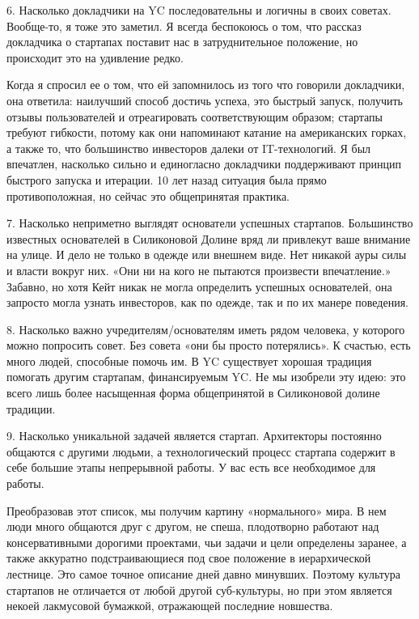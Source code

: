 \documentclass[ebook,12pt,oneside,openany]{memoir}
\begin{document}
6. Насколько докладчики на YC последовательны и логичны в своих
советах. Вообще-то, я тоже это заметил. Я всегда беспокоюсь о том, что
рассказ докладчика о стартапах поставит нас в затруднительное
положение, но происходит это на удивление редко.

Когда я спросил ее о том, что ей запомнилось из того что говорили
докладчики, она ответила: наилучший способ достичь успеха, это быстрый
запуск, получить отзывы пользователей и отреагировать соответствующим
образом; стартапы требуют гибкости, потому как они напоминают катание
на американских горках, а также то, что большинство инвесторов далеки
от IT-технологий. Я был впечатлен, насколько сильно и единогласно
докладчики поддерживают принцип быстрого запуска и итерации. 10 лет
назад ситуация была прямо противоположная, но сейчас это общепринятая
практика.


7. Насколько неприметно выглядят основатели успешных стартапов.
Большинство известных основателей в Силиконовой Долине вряд ли
привлекут ваше внимание на улице. И дело не только в одежде или
внешнем виде. Нет никакой ауры силы и власти вокруг них. «Они ни на
кого не пытаются произвести впечатление.» Забавно, но хотя Кейт никак
не могла определить успешных основателей, она запросто могла узнать
инвесторов, как по одежде, так и по их манере поведения.


8. Насколько важно учредителям/основателям иметь рядом человека, у
которого можно попросить совет. Без совета «они бы просто потерялись».
К счастью, есть много людей, способные помочь им. В YC существует
хорошая традиция помогать другим стартапам, финансируемым YC. Не мы
изобрели эту идею: это всего лишь более насыщенная форма общепринятой
в Силиконовой долине традиции.


9. Насколько уникальной задачей является стартап. Архитекторы
постоянно общаются с другими людьми, а технологический процесс
стартапа содержит в себе большие этапы непрерывной работы. У вас есть
все необходимое для работы.


Преобразовав этот список, мы получим картину «нормального» мира. В нем
люди много общаются друг с другом, не спеша, плодотворно работают над
консервативными дорогими проектами, чьи задачи и цели определены
заранее, а также аккуратно подстраивающиеся под свое положение в
иерархической лестнице. Это самое точное описание дней давно минувших.
Поэтому культура стартапов не отличается от любой другой суб-культуры,
но при этом является некоей лакмусовой бумажкой, отражающей последние
новшества.
\end{document}
